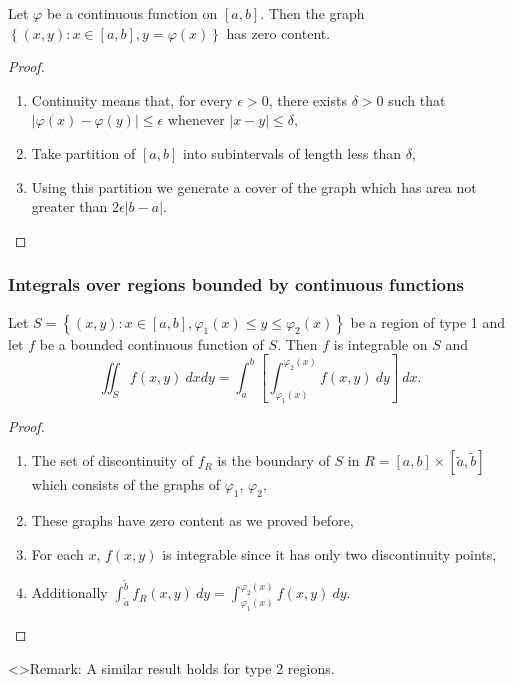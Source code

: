 \documentclass[aspectratio=169,handout]{beamer}
\newcommand{\abs}[1]{\left|#1\right|} %
\begin{document}
\begin{frame}

    \begin{theorem}
        Let \(\varphi\) be a continuous function on \([a,b]\). 
        Then the graph 
        \(\left\{(x,y): x\in [a,b], y=\varphi(x)\right\}\)
        has zero content.
    \end{theorem}
    \begin{proof}
        \begin{enumerate}
            \item Continuity means that, for every \(\epsilon>0\), there exists \(\delta>0\) such that \(\abs{\varphi(x) - \varphi(y)}\leq \epsilon\) whenever \(\abs{x-y}\leq \delta\),
            \item Take partition of \([a,b]\) into subintervals of length less than \(\delta\),
            \item Using this partition we generate a cover of the graph which has area not greater than \(2\epsilon \abs{b-a}\).
        \end{enumerate}
    \end{proof}

\end{frame}

\begin{frame}
    \frametitle{Integrals over regions bounded by continuous functions}
    

    \begin{theorem}
        Let \(S = \left\{(x,y): x \in [a,b], \varphi_1(x) \leq y \leq \varphi_2(x)\right\}\) be a region of type 1 and let \(f\) be a bounded continuous function of \(S\).
        Then \(f\) is integrable on \(S\) and
        \[
            \iint_{S} f(x,y) \ dxdy = \int_{a}^{b} \left[\int_{\varphi_1(x)}^{\varphi_2(x)} f(x,y) \ dy\right] \ dx.
        \] 
    \end{theorem}
    
    \begin{proof}
        \begin{enumerate}
            \item The set of discontinuity of \(f_{R}\) is the boundary of \(S\) in \(R=[a,b]\times[\tilde a,\tilde b]\) which consists of the graphs of \(\varphi_1\), \(\varphi_2\),
            \item These graphs have zero content as we proved before,
            \item For each \(x\), \(f(x,y)\) is integrable since it has only two discontinuity points,
            \item Additionally \(\int_{\tilde a}^{\tilde b} f_{R}(x,y) \ dy =  \int_{\varphi_1(x)}^{\varphi_2(x)} f(x,y) \ dy \). \qedhere
        \end{enumerate}
    \end{proof}

    \structure<>{Remark:} A similar result holds for type 2 regions.
\end{frame}
\end{document}
